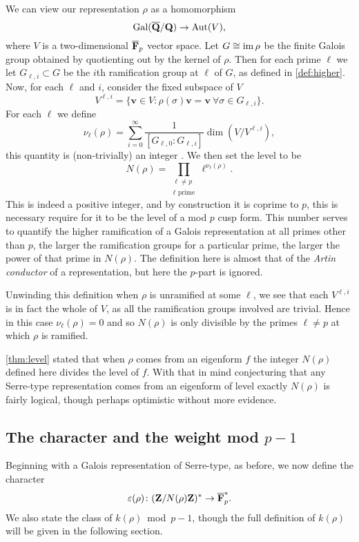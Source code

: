\documentclass[a4paper,12pt]{article}
\begin{document}
We can view our representation $\rho$ as a homomorphism
\[
\operatorname{Gal}(\overline{\mathbf{Q}}/\mathbf{Q}) \to \operatorname{Aut}(V),
\]
where $V$ is a two-dimensional $\overline{\mathbf{F}}_p$ vector space.
Let $G\cong \operatorname{im} \rho$ be the finite Galois group obtained by quotienting out by the kernel of $\rho$.
Then for each prime $\ell$ we let $G_{\ell,i}\subset G$ be the $i$th ramification group at $\ell$ of $G$, as defined in \cref{def:higher}.
Now, for each $\ell$ and $i$, consider the fixed subspace of $V$
\[
V^{\ell,i} = \{\mathbf{v}\in V : \rho(\sigma) \mathbf{v} = \mathbf{v}\ \forall \sigma \in G_{\ell,i}\}.
\]
For each $\ell$ we define
\[
\nu_\ell(\rho) = \sum_{i = 0}^{\infty} \frac{1}{[G_{\ell,0} : G_{\ell,i}]} \dim(V/V^{\ell,i}),
\]
this quantity is (non-trivially) an integer \cite[p. 99]{SerreLF}.
We then set the level to be
\[
N(\rho) = \prod_{\substack{\ell \ne p\\ \ell\text{ prime}}} \ell^{\nu_\ell(\rho)}.
\]
This is indeed a positive integer, and by construction it is coprime to $p$, this is necessary require for it to be the level of a mod $p$ cusp form.
This number serves to quantify the higher ramification of a Galois representation at all primes other than $p$, the larger the ramification groups for a particular prime, the larger the power of that prime in $N(\rho)$.
The definition here is almost that of the \emph{Artin conductor} of a representation, but here the $p$-part is ignored.

\begin{rmk}\label{rmk:unram}
Unwinding this definition when $\rho$ is unramified at some $\ell$, we see that each $V^{\ell,i}$ is in fact the whole of $V$, as all the ramification groups involved are trivial.
Hence in this case $\nu_\ell(\rho) = 0$ and so $N(\rho)$ is only divisible by the primes $\ell \ne p$ at which $\rho$ is ramified.
\end{rmk}

\cref{thm:level} stated that when $\rho$ comes from an eigenform $f$ the integer $N(\rho)$ defined here divides the level of $f$.
With that in mind conjecturing that any Serre-type representation comes from an eigenform of level exactly $N(\rho)$ is fairly logical, though perhaps optimistic without more evidence.


\subsection{The character and the weight mod $p-1$}\label{subsec:char}
Beginning with a Galois representation of Serre-type, as before, we now define the character
\[
\varepsilon(\rho)\colon  (\mathbf{Z}/N(\rho)\mathbf{Z})^* \to \overline{\mathbf{F}}_p^*.
\]
We also state the class of $k(\rho)$~mod~$p-1$, though the full definition of $k(\rho)$ will be given in the following section.
\end{document}
